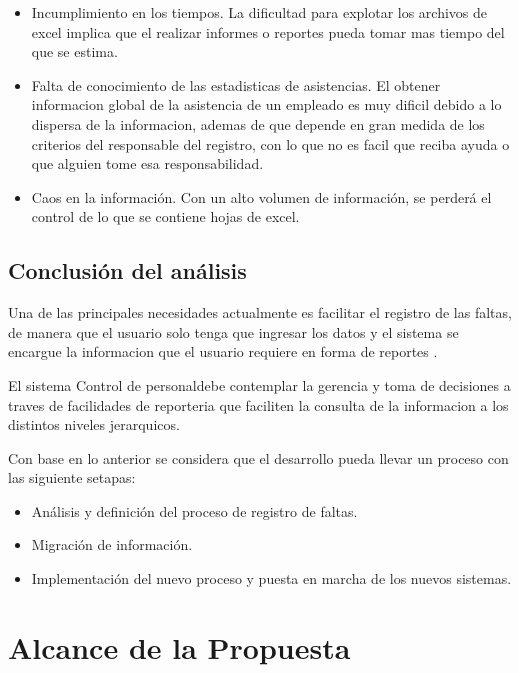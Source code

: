 \documentclass[10pt]{book}
\newcommand{\nombreProyecto}{ Control de personal}
\begin{document}
\begin{itemize}	
	\item Incumplimiento en los tiempos. La dificultad para explotar los archivos de excel implica que el realizar informes o reportes pueda tomar mas tiempo del que se estima.
	\item Falta de conocimiento de las estadisticas de asistencias. El obtener informacion global de la asistencia de un empleado es muy dificil debido a lo dispersa de la informacion, ademas de que depende en gran medida de los criterios del responsable del registro, con lo que no es facil que reciba ayuda o que alguien tome esa responsabilidad.
	\item Caos en la información. Con un alto volumen de información, se perderá el control de lo que se contiene hojas de excel.
\end{itemize}


\section{Conclusión del análisis}
	
	Una de las principales necesidades actualmente es facilitar el registro de las faltas, de manera que el usuario solo tenga que ingresar los datos y el sistema se encargue la informacion que el usuario requiere en forma de reportes .
	
	El sistema \nombreProyecto debe contemplar la gerencia y toma de decisiones a traves de facilidades de reporteria que faciliten la consulta de la informacion a los distintos niveles jerarquicos.
	
	Con base en lo anterior se considera que el desarrollo pueda llevar un proceso con las siguiente setapas:
	
\begin{itemize}
	\item Análisis y definición del proceso de registro de faltas.
	\item Migración de información.
	\item Implementación del nuevo proceso y puesta en marcha de los nuevos sistemas.
\end{itemize}

\chapter{Alcance de la Propuesta}
\end{document}
